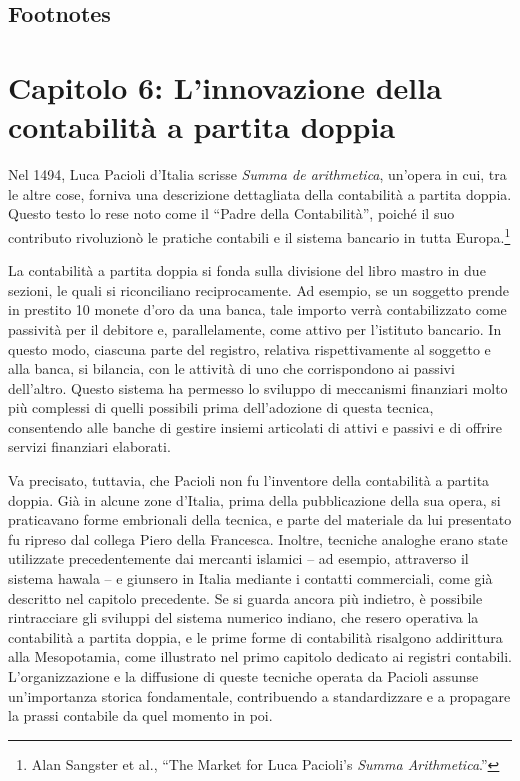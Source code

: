 \documentclass[
  a5paper,
  smalldemyvopaper,10pt,twoside,onecolumn,openright,extrafontsizes,hidelinks]{memoir}
\begin{document}
\section{Footnotes}\label{footnotes-5}


\chapter{Capitolo 6: L'innovazione della contabilità a partita
doppia}\label{capitolo-6-linnovazione-della-contabilituxe0-a-partita-doppia}

Nel 1494, Luca Pacioli d'Italia scrisse \emph{Summa de arithmetica},
un'opera in cui, tra le altre cose, forniva una descrizione dettagliata
della contabilità a partita doppia. Questo testo lo rese noto come il
``Padre della Contabilità'', poiché il suo contributo rivoluzionò le
pratiche contabili e il sistema bancario in tutta Europa.\footnote{Alan
  Sangster et al., ``The Market for Luca Pacioli's \emph{Summa
  Arithmetica}.''}

La contabilità a partita doppia si fonda sulla divisione del libro
mastro in due sezioni, le quali si riconciliano reciprocamente. Ad
esempio, se un soggetto prende in prestito 10 monete d'oro da una banca,
tale importo verrà contabilizzato come passività per il debitore e,
parallelamente, come attivo per l'istituto bancario. In questo modo,
ciascuna parte del registro, relativa rispettivamente al soggetto e alla
banca, si bilancia, con le attività di uno che corrispondono ai passivi
dell'altro. Questo sistema ha permesso lo sviluppo di meccanismi
finanziari molto più complessi di quelli possibili prima dell'adozione
di questa tecnica, consentendo alle banche di gestire insiemi articolati
di attivi e passivi e di offrire servizi finanziari elaborati.

Va precisato, tuttavia, che Pacioli non fu l'inventore della contabilità
a partita doppia. Già in alcune zone d'Italia, prima della pubblicazione
della sua opera, si praticavano forme embrionali della tecnica, e parte
del materiale da lui presentato fu ripreso dal collega Piero della
Francesca. Inoltre, tecniche analoghe erano state utilizzate
precedentemente dai mercanti islamici -- ad esempio, attraverso il
sistema hawala -- e giunsero in Italia mediante i contatti commerciali,
come già descritto nel capitolo precedente. Se si guarda ancora più
indietro, è possibile rintracciare gli sviluppi del sistema numerico
indiano, che resero operativa la contabilità a partita doppia, e le
prime forme di contabilità risalgono addirittura alla Mesopotamia, come
illustrato nel primo capitolo dedicato ai registri contabili.
L'organizzazione e la diffusione di queste tecniche operata da Pacioli
assunse un'importanza storica fondamentale, contribuendo a
standardizzare e a propagare la prassi contabile da quel momento in poi.
\end{document}
